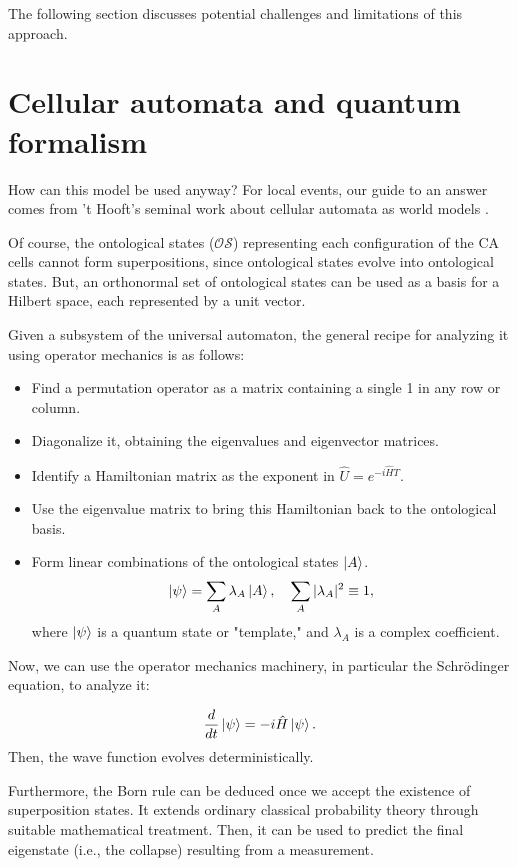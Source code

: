 \documentclass[12pt,english]{article}
\begin{document}
The following section discusses potential challenges and limitations of this approach.


\section{Cellular automata and quantum formalism} \label{sec:bridge}How can this model be used anyway? For local events, our guide to an answer comes from 't Hooft's seminal work about cellular automata as world models \cite{thooft}.

Of course, the ontological states ($\mathcal{OS}$) representing each configuration of the CA cells cannot form superpositions, since ontological states evolve into ontological states. But, an orthonormal set of ontological states can be used as a basis for a Hilbert space, each represented by a unit vector.

Given a subsystem of the universal automaton, the general recipe for analyzing it using operator mechanics is as follows:

\begin{itemize}
    \item Find a permutation operator as a matrix containing a single 1 in any row or column.
    \item Diagonalize it, obtaining the eigenvalues and eigenvector matrices.
    \item Identify a Hamiltonian matrix as the exponent in $\hat{U}=e^{-i\hat{H}T}$.
    \item Use the eigenvalue matrix to bring this Hamiltonian back to the ontological basis.
    \item Form linear combinations of the ontological states $\ket{A}$.
\[
\ket{\psi} = \sum_A \lambda_A \ket{A}, \quad \sum_A |\lambda_A|^2 \equiv 1,
\]
where $\ket{\psi}$ is a quantum state or "template," and $\lambda_A$ is a complex coefficient.
\end{itemize}

Now, we can use the operator mechanics machinery, in particular the Schrödinger equation, to analyze it:

\[
\frac{d}{dt}\ket{\psi} = -i\hat{H}\ket{\psi}.
\]
Then, the wave function evolves deterministically.

Furthermore, the Born rule can be deduced once we accept the existence of superposition states. It extends ordinary classical probability theory through suitable mathematical treatment. Then, it can be used to predict the final eigenstate (i.e., the collapse) resulting from a measurement.
\end{document}
